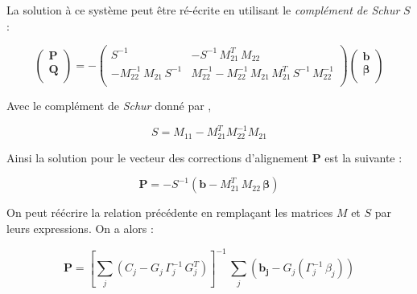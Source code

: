 \begin{appendices}
   La solution \`a ce syst\`eme peut \^etre r\'e-\'ecrite en utilisant le \textit{compl\'ement de Schur} $S$ :
   
   \begin{equation}
     \left(\begin{array}{c}
      \mathbf{P} \\ \hline
      \mathbf{Q} \\
     \end{array}\right) = - \left(\begin{array}{c|c}
      S^{-1} & -S^{-1} \, M_{21}^T \, M_{22} \\ \hline
      -M_{22}^{-1} \, M_{21} \, S^{-1} & M_{22}^{-1} - M_{22}^{-1} \, M_{21} \, M_{21}^T \, S^{-1} \, M_{22}^{-1} \\
     \end{array}\right) \left(\begin{array}{c}
      \mathbf{b} \\ \hline
      \mathbf{\beta} \\
     \end{array}\right)
   \end{equation}
   
   \medskip
   
   Avec le compl\'ement de \textit{Schur} donn\'e par ,
   
   \begin{equation}
   S= M_{11} - M_{21}^{T} M_{22}^{-1} M_{21}
   \end{equation}
   
   \medskip
   
   Ainsi la solution pour le vecteur des corrections d'alignement $\mathbf{P}$ est la suivante :
   
   \begin{equation}
    \mathbf{P} = -S^{-1} \left( \mathbf{b} - M_{21}^T \, M_{22} \, \mathbf{\beta} \right)
   \end{equation}

   On peut r\'e\'ecrire la relation pr\'ec\'edente en remplaçant les matrices $M$ et $S$ par leurs expressions. On a alors :
   
   \begin{equation}
    \mathbf{P} = \left[ \sum_j \left( C_j- G_j \, \Gamma_j^{-1} \, G_j^T \right) \right]^{-1} \, \sum_j \left( \mathbf{b_j} - G_j(\Gamma_j^{-1} \, \beta_j) \right)
   \end{equation}
   

\end{appendices}
